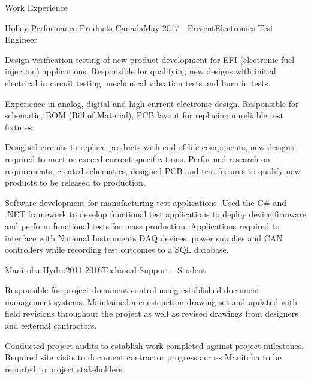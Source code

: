 \documentclass{resume} %
\begin{document}
\begin{rSection}{Work Experience}

\begin{rSubsection}{Holley Performance Products Canada}{May 2017 - Present}{Electronics Test Engineer}{}
\item Design verification testing of new product development for EFI (electronic fuel injection) applications. Responsible for qualifying new designs with initial electrical in circuit testing, mechanical vibration tests and burn in tests.

\item Experience in analog, digital and high current electronic design. Responsible for schematic, BOM (Bill of Material), PCB layout for replacing unreliable test fixtures. 

\item Designed circuits to replace products with end of life components, new designs required to meet or exceed current specifications. Performed research on requirements, created schematics, designed PCB and test fixtures to qualify new products to be released to production.

\item Software development for manufacturing test applications. Used the C\# and .NET framework to develop functional test applications to deploy device firmware and perform functional tests for mass production. Applications required to interface with National Instruments DAQ devices, power supplies and CAN controllers while recording test outcomes to a SQL database.
\end{rSubsection}

\begin{rSubsection}{Manitoba Hydro}{2011-2016}{Technical Support - Student}{}
\item Responsible for project document control using established document management systems. Maintained a construction drawing set and updated with field revisions throughout the project as well as revised drawings from designers and external contractors. 
\item Conducted project audits to establish work completed against project milestones. Required site visits to document contractor progress across Manitoba to be reported to project stakeholders.
\end{rSubsection}
\end{rSection}
\end{document}
